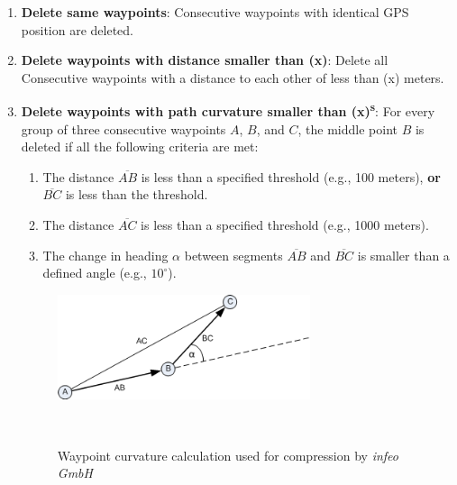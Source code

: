 \documentclass[a4paper,12pt,twoside]{scrreprt}
\begin{document}
\begin{enumerate}
  \item \textbf{Delete same waypoints}: Consecutive waypoints with identical
        GPS position are deleted.
  \item \textbf{Delete waypoints with distance smaller than (x)}: Delete all
        Consecutive waypoints with a distance to each other of less than (x)
        meters.
  \item \textbf{Delete waypoints with path curvature smaller than
          (x)\textsuperscript{s}}: For every group of three consecutive
        waypoints \( A \), \( B \), and \( C \), the middle point \( B \) is
        deleted if
        all the following criteria are met:
        \begin{enumerate}
          \item The distance \( \overline{AB} \) is less than a specified
                threshold (e.g., 100 meters), \textbf{or} \( \overline{BC} \)
                is less than the
                threshold.
          \item The distance \( \overline{AC} \) is less than a specified
                threshold (e.g., 1000 meters).
          \item The change in heading \( \alpha \) between segments \(
                \overline{AB} \) and \( \overline{BC} \) is smaller than a
                defined angle (e.g.,
                \(10^\circ\)).
        \end{enumerate}
        \begin{figure}[H]
          \centering
          \vspace{-1em}

          \includegraphics[width=0.7\textwidth]{Figures/problem_definition/Aufzeichnune-komprimieren-winkelreduktion.png}
          \caption{Waypoint curvature calculation used for compression by
            \textit{infeo GmbH}}~\cite{noauthor_route_nodate}
          \label{fig:waypoint_curvature_calculation}
          \vspace{-1em}
        \end{figure}
        \FloatBarrier

\end{enumerate}
\end{document}
